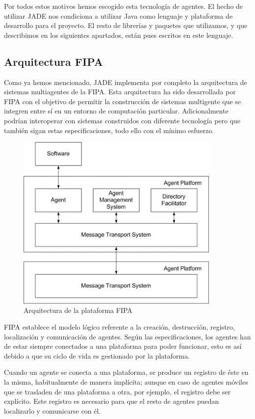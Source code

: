 Por todos estos motivos hemos escogido esta tecnología de agentes. El hecho de
utilizar JADE nos condiciona a utilizar Java como lenguaje y plataforma de
desarrollo para el proyecto. El resto de librerías y paquetes que utilizamos, y
que describimos en los siguientes apartados, están pues escritos en este
lenguaje.

\subsection{Arquitectura FIPA}

Como ya hemos mencionado, JADE implementa por completo la arquitectura de
sistemas multiagentes de la FIPA. Esta arquitectura ha sido desarrollada por
FIPA con el objetivo de permitir la construcción de sistemas multigente que se
integren entre sí en un entorno de computación particular. Adicionalmente
podrían interoperar con sistemas construidos con diferente tecnología pero que
también sigan estas especificaciones, todo ello con el mínimo esfuerzo.

\begin{figure}[H]
 \centering
 \includegraphics[width=100mm]{figuras/cap4/fipa.png}
 \caption{Arquitectura de la plataforma FIPA}
\end{figure}

FIPA establece el modelo lógico referente a la creación, destrucción, registro,
localización y comunicación de agentes. Según las especificaciones, los agentes
han de estar siempre conectados a una plataforma para poder funcionar, esto es
así debido a que su ciclo de vida es gestionado por la plataforma.

Cuando un agente se conecta a una plataforma, se produce un registro de éste
en la misma, habitualmente de manera implícita; aunque en caso de agentes
móviles que se trasladen de una plataforma a otra, por ejemplo, el registro debe
ser explícito. Este registro es necesario para que el resto de agentes puedan
localizarlo y comunicarse con él.

